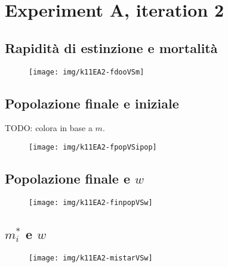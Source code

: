 \section{Experiment A, iteration 2}

\subsection{Rapidità di estinzione e mortalità}
\begin{figure}[pbh]
    \centering
    \texttt{[image: img/k11EA2-fdooVSm]}

    \caption[Experiment A2:1]{}

    \label{img:kh11expA21}
\end{figure}

\subsection{Popolazione finale e iniziale}
TODO: colora in base a $m$. %
\begin{figure}[pbh]
    \centering
    \texttt{[image: img/k11EA2-fpopVSipop]}

    \caption[Experiment A2:2]{}

    \label{img:kh11expA22}
\end{figure}

\subsection{Popolazione finale e $w$}
\begin{figure}[pbh]
    \centering
    \texttt{[image: img/k11EA2-finpopVSw]}

    \caption[Experiment A2:3]{}

    \label{img:kh11expA23}
\end{figure}

\subsection{$m_i^*$ e $w$}
\begin{figure}[pbh]
    \centering
    \texttt{[image: img/k11EA2-mistarVSw]}

    \caption[Experiment A2:4]{}

    \label{img:kh11expA24}
\end{figure}
